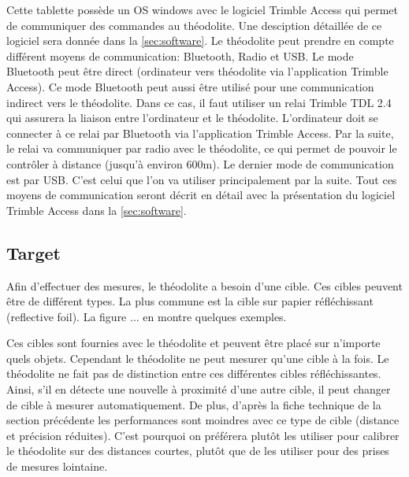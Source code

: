 \documentclass[10pt,letterpaper,oneside]{article}
\begin{document}
Cette tablette possède un OS windows avec le logiciel Trimble Access qui permet de communiquer des commandes au théodolite.
Une desciption détaillée de ce logiciel sera donnée dans la \autoref{sec:software}.
Le théodolite peut prendre en compte différent moyens de communication: Bluetooth, Radio et USB.
Le mode Bluetooth peut être direct (ordinateur vers théodolite via l'application Trimble Access).
Ce mode Bluetooth peut aussi être utilisé pour une communication indirect vers le théodolite.
Dans ce cas, il faut utiliser un relai Trimble TDL 2.4 qui assurera la liaison entre l'ordinateur et le théodolite.
L'ordinateur doit se connecter à ce relai par Bluetooth via l'application Trimble Access. 
Par la suite, le relai va communiquer par radio avec le théodolite, ce qui permet de pouvoir le contrôler à distance (jusqu'à environ 600m).
Le dernier mode de communication est par USB.
C'est celui que l'on va utiliser principalement par la suite.
Tout ces moyens de communication seront décrit en détail avec la présentation du logiciel Trimble Access dans la \autoref{sec:software}.

\subsection{Target}

Afin d'effectuer des mesures, le théodolite a besoin d'une cible.
Ces cibles peuvent être de différent types.
La plus commune est la cible sur papier réfléchissant (reflective foil).
La figure ... en montre quelques exemples.


Ces cibles sont fournies avec le théodolite et peuvent être placé sur n'importe quels objets.
Cependant le théodolite ne peut mesurer qu'une cible à la fois.
Le théodolite ne fait pas de distinction entre ces différentes cibles réfléchissantes. 
Ainsi, s'il en détecte une nouvelle à proximité d'une autre cible, il peut changer de cible à mesurer automatiquement.
De plus, d'après la fiche technique de la section précédente les performances sont moindres avec ce type de cible (distance et précision réduites).
C'est pourquoi on préférera plutôt les utiliser pour calibrer le théodolite sur des distances courtes, plutôt que de les utiliser pour des prises de mesures lointaine. 
\end{document}
